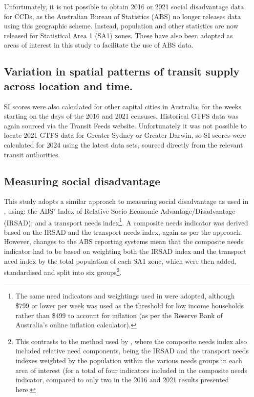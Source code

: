\documentclass[preprint, 3p,
authoryear]{elsarticle} %
\begin{document}
Unfortunately, it is not possible to obtain 2016 or 2021 social
disadvantage data for CCDs, as the Australian Bureau of Statistics (ABS)
no longer releases data using this geographic scheme. Instead,
population and other statistics are now released for Statistical Area 1
(SA1) zones. These have also been adopted as areas of interest in this
study to facilitate the use of ABS data.

\subsection{Variation in spatial patterns of transit supply across
location and
time.}\label{variation-in-spatial-patterns-of-transit-supply-across-location-and-time.}

SI scores were also calculated for other capital cities in Australia,
for the weeks starting on the days of the 2016 and 2021 censuses.
Historical GTFS data was again sourced via the Transit Feeds website.
Unfortunately it was not possible to locate 2021 GTFS data for Greater
Sydney or Greater Darwin, so SI scores were calculated for 2024 using
the latest data sets, sourced directly from the relevant transit
authorities.

\subsection{Measuring social
disadvantage}\label{measuring-social-disadvantage}

This study adopts a similar approach to measuring social disadvantage as
used in \citet{currie2010identifying}, using: the ABS' Index of Relative
Socio-Economic Advantage/Disadvantage (IRSAD); and a transport needs
index\footnote{The same need indicators and weightings used in
  \citet{currie2010identifying} were adopted, although \$799 or lower
  per week was used as the threshold for low income households rather
  than \$499 to account for inflation (as per the Reserve Bank of
  Australia's online inflation calculator).}. A composite needs
indicator was derived based on the IRSAD and the transport needs index,
again as per the \citet{currie2010identifying} approach. However,
changes to the ABS reporting systems mean that the composite needs
indicator had to be based on weighting both the IRSAD index and the
transport need index by the total population of each SA1 zone, which
were then added, standardised and split into six groups\footnote{This
  contrasts to the method used by \citet{currie2010identifying}, where
  the composite needs index also included relative need components,
  being the IRSAD and the transport needs indexes weighted by the
  population within the various needs groups in each area of interest
  (for a total of four indicators included in the composite needs
  indicator, compared to only two in the 2016 and 2021 results presented
  here.}.
\end{document}
